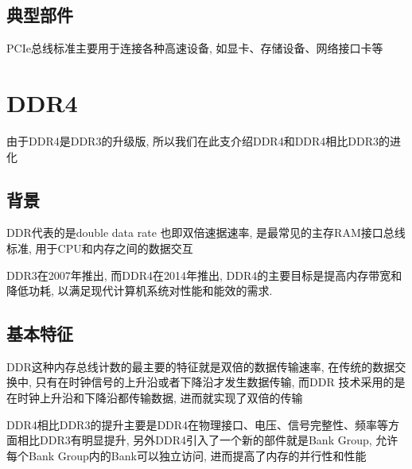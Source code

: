 \documentclass[14pt]{article}
\begin{document}
\subsection{典型部件}
PCIe总线标准主要用于连接各种高速设备, 如显卡、存储设备、网络接口卡等

\bigskip
\bigskip
\bigskip
\bigskip
\bigskip

\section{DDR4}
由于DDR4是DDR3的升级版, 所以我们在此支介绍DDR4和DDR4相比DDR3的进化
\subsection{背景}
DDR代表的是double data rate 也即双倍速据速率, 是最常见的主存RAM接口总线标准, 用于CPU和内存之间的数据交互\par
DDR3在2007年推出, 而DDR4在2014年推出, DDR4的主要目标是提高内存带宽和降低功耗, 以满足现代计算机系统对性能和能效的需求.
\subsection{基本特征}
DDR这种内存总线计数的最主要的特征就是双倍的数据传输速率, 在传统的数据交换中, 只有在时钟信号的上升沿或者下降沿才发生数据传输, 而DDR
技术采用的是在时钟上升沿和下降沿都传输数据, 进而就实现了双倍的传输\par
DDR4相比DDR3的提升主要是DDR4在物理接口、电压、信号完整性、频率等方面相比DDR3有明显提升, 另外DDR4引入了一个新的部件就是Bank Group,
允许每个Bank Group内的Bank可以独立访问, 进而提高了内存的并行性和性能\par
\end{document}
